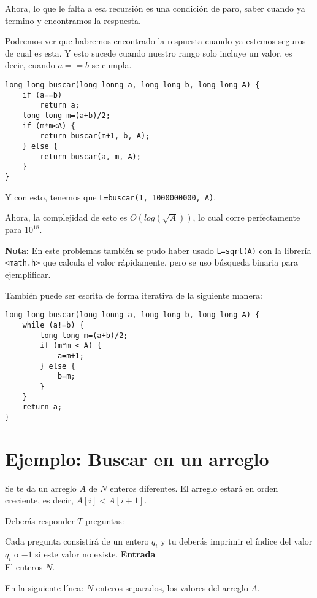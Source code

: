 Ahora, lo que le falta a esa recursión es una condición de paro, saber cuando ya termino y encontramos la respuesta.

Podremos ver que habremos encontrado la respuesta cuando ya estemos seguros de cual es esta. Y esto sucede cuando nuestro rango solo incluye un valor, es decir, cuando \(a==b\) se cumpla.

\begin{minipage}{\textwidth}
\begin{lstlisting}
long long buscar(long lonng a, long long b, long long A) {
	if (a==b)
		return a;
	long long m=(a+b)/2;
	if (m*m<A) {
		return buscar(m+1, b, A);
	} else {
		return buscar(a, m, A);
	}
}
\end{lstlisting}
\end{minipage}
Y con esto, tenemos que \verb|L=buscar(1, 1000000000, A)|.

Ahora, la complejidad de esto es \(O(log(\sqrt{A}))\), lo cual corre perfectamente para \(10^{18}\).

\textbf{Nota:} En este problemas también se pudo haber usado \lstinline|L=sqrt(A)| con la librería \verb|<math.h>| que calcula el valor rápidamente, pero se uso búsqueda binaria para ejemplificar.

También puede ser escrita de forma iterativa de la siguiente manera:

\begin{minipage}{\textwidth}
	\begin{lstlisting}
long long buscar(long lonng a, long long b, long long A) {
	while (a!=b) {
		long long m=(a+b)/2;
		if (m*m < A) {
			a=m+1;
		} else {
			b=m;
		}
	}
	return a;
}
	\end{lstlisting}
\end{minipage}

\section*{Ejemplo: Buscar en un arreglo}
Se te da un arreglo \(A\) de \(N\) enteros diferentes. El arreglo estará en orden creciente, es decir, \(A[i] < A[i+1]\).

Deberás responder \(T\) preguntas:

Cada pregunta consistirá de un entero \(q_i\) y tu deberás imprimir el índice del valor \(q_i\) o \(-1\) si este valor no existe.
\textbf{Entrada}\\
El enteros \(N\).

En la siguiente línea: \(N\) enteros separados, los valores del arreglo \(A\).


